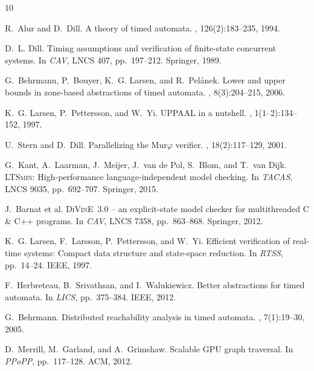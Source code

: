 \documentclass[runningheads]{llncs}
\begin{document}














\begin{thebibliography}{10}

R.~Alur and D.~Dill.
\newblock A theory of timed automata.
, 126(2):183--235, 1994.

D.~L. Dill.
\newblock Timing assumptions and verification of finite-state concurrent
  systems.
\newblock In {\em CAV}, LNCS 407, pp.~197--212. Springer, 1989.

G.~Behrmann, P.~Bouyer, K.~G. Larsen, and R.~Pel{\'a}nek.
\newblock Lower and upper bounds in zone-based abstractions of timed automata.
, 8(3):204--215, 2006.

K.~G. Larsen, P.~Pettersson, and W.~Yi.
\newblock \textsc{UPPAAL} in a nutshell.
, 1(1--2):134--152, 1997.

U.~Stern and D.~Dill.
\newblock Parallelizing the Mur$\varphi$ verifier.
, 18(2):117--129, 2001.

G.~Kant, A.~Laarman, J.~Meijer, J.~van de Pol, S.~Blom, and T.~van Dijk.
\newblock \textsc{LTSmin}: High-performance language-independent model checking.
\newblock In {\em TACAS}, LNCS 9035, pp.~692--707. Springer, 2015.

J.~Barnat et al.
\newblock \textsc{DiVinE}~3.0 -- an explicit-state model checker for
  multithreaded C \& C++ programs.
\newblock In {\em CAV}, LNCS 7358, pp.~863--868. Springer, 2012.

K.~G. Larsen, F.~Larsson, P.~Pettersson, and W.~Yi.
\newblock Efficient verification of real-time systems: Compact data structure
  and state-space reduction.
\newblock In {\em RTSS}, pp.~14--24. IEEE, 1997.

F.~Herbreteau, B.~Srivathsan, and I.~Walukiewicz.
\newblock Better abstractions for timed automata.
\newblock In {\em LICS}, pp.~375--384. IEEE, 2012.

G.~Behrmann.
\newblock Distributed reachability analysis in timed automata.
, 7(1):19--30, 2005.

D.~Merrill, M.~Garland, and A.~Grimshaw.
\newblock Scalable GPU graph traversal.
\newblock In {\em PPoPP}, pp.~117--128. ACM, 2012.

\end{thebibliography}
\end{document}
